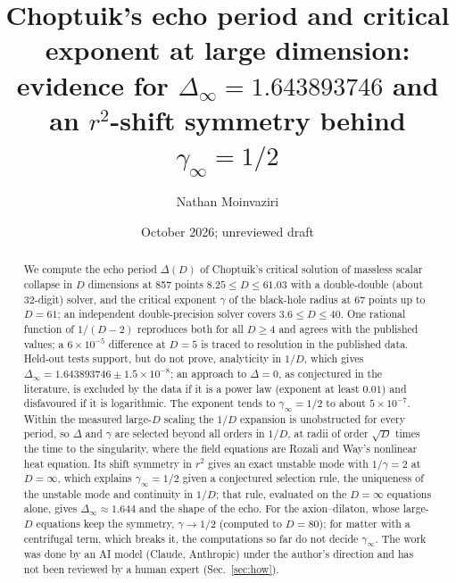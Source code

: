 \documentclass[aps,prd,onecolumn,superscriptaddress,nofootinbib,10pt]{revtex4-2}
\newcommand{\Dinf}{\Delta_\infty}
\begin{document}
\title{Choptuik's echo period and critical exponent at large dimension:\\
evidence for $\Delta_\infty = 1.643893746$ and an $r^2$-shift symmetry behind $\gamma_\infty = 1/2$}

\author{Nathan Moinvaziri}
\date{October 2026; unreviewed draft}

\begin{abstract}
We compute the echo period $\Delta(D)$ of Choptuik's critical solution of massless scalar collapse in $D$ dimensions at
857 points $8.25 \le D \le 61.03$ with a double-double (about 32-digit) solver, and the critical exponent $\gamma$ of the
black-hole radius at 67 points up to $D = 61$; an independent double-precision solver covers $3.6 \le D \le 40$. One
rational function of $1/(D-2)$ reproduces both for all $D \ge 4$ and agrees with the published values; a
$6\times10^{-5}$ difference at $D = 5$ is traced to resolution in the published data. Held-out tests support, but do not
prove, analyticity in $1/D$, which gives $\Dinf = 1.643893746 \pm 1.5\times10^{-8}$; an approach to $\Delta = 0$, as
conjectured in the literature, is excluded by the data if it is a power law (exponent at least $0.01$) and disfavoured if
it is logarithmic.
The exponent tends to $\gamma_\infty = 1/2$ to about $5\times10^{-7}$. Within the measured large-$D$ scaling the $1/D$
expansion is unobstructed for every period, so $\Delta$ and $\gamma$ are selected beyond all orders in $1/D$, at radii of
order $\sqrt D$ times the time to the singularity, where the field equations are Rozali and Way's nonlinear heat equation.
Its shift symmetry in $r^2$ gives an exact unstable mode with $1/\gamma = 2$ at $D = \infty$, which explains
$\gamma_\infty = 1/2$ given a conjectured selection rule, the uniqueness of the unstable mode and continuity in $1/D$; that
rule, evaluated on
the $D = \infty$ equations alone, gives $\Dinf \approx 1.644$ and the shape of the echo. For
the axion--dilaton, whose large-$D$ equations keep the symmetry, $\gamma \to 1/2$ (computed to $D = 80$); for matter with
a centrifugal term, which breaks it, the computations so far do not decide $\gamma_\infty$. The work was done
by an AI model (Claude, Anthropic) under the author's direction and has not been reviewed by a human expert
(Sec.~\ref{sec:how}).
\end{abstract}

\maketitle
\end{document}
